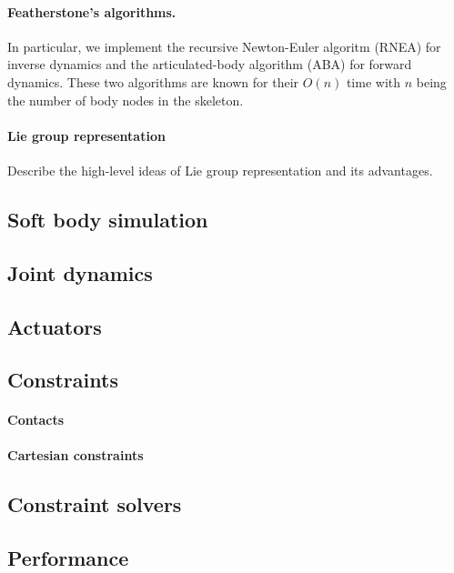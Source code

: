 \paragraph{Featherstone's algorithms.} In particular, we implement the
recursive Newton-Euler algoritm (RNEA) for inverse dynamics and the
articulated-body algorithm (ABA) for forward dynamics. These two
algorithms are known for their $O(n)$ time with $n$ being the number of
body nodes in the skeleton. 

\paragraph{Lie group representation}
Describe the high-level ideas of Lie group representation and its advantages.


\subsection{Soft body simulation}

\subsection{Joint dynamics}

\subsection{Actuators}

\subsection{Constraints}
\paragraph{Contacts}
\paragraph{Cartesian constraints}

\subsection{Constraint solvers}

\subsection{Performance}

